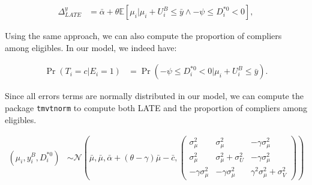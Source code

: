 \documentclass[
]{book}
\newcommand{\esp}[1]{\mathbb{E}[ #1 ]}
\theoremstyle{definition}
\theoremstyle{definition}
\theoremstyle{definition}
\theoremstyle{definition}
\theoremstyle{remark}
\begin{document}
\begin{align*}
  \Delta^y_{LATE} & = \bar{\alpha}+ \theta\esp{\mu_i|\mu_i+U_i^B\leq\bar{y} \land -\psi\leq D_i^{*0}<0},
\end{align*}

Using the same approach, we can also compute the proportion of compliers among eligibles.
In our model, we indeed have:

\begin{align*}
  \Pr(T_i=c|E_i=1) & = \Pr(-\psi\leq D_i^{*0}<0|\mu_i+U_i^B\leq\bar{y}).
\end{align*}

Since all errors terms are normally distributed in our model, we can compute the package \texttt{tmvtnorm} to compute both LATE and the proportion of compliers among eligibles.

\begin{align*}
  (\mu_i,y_i^B,D_i^{*0}) & \sim \mathcal{N}\left(\bar{\mu},\bar{\mu},\bar{\alpha}+(\theta-\gamma)\bar{\mu}-\bar{c},
                                        \left(\begin{array}{ccc}
                                              \sigma^2_{\mu} & \sigma^2_{\mu} & -\gamma\sigma^2_{\mu} \\
                                              \sigma^2_{\mu} & \sigma^2_{\mu} + \sigma^2_{U} & -\gamma\sigma^2_{\mu} \\
                                              -\gamma\sigma^2_{\mu} & -\gamma\sigma^2_{\mu} & \gamma^2\sigma^2_{\mu}+\sigma^2_{V}
                                              \end{array}
                                        \right)
                                      \right)
\end{align*}
\end{document}
